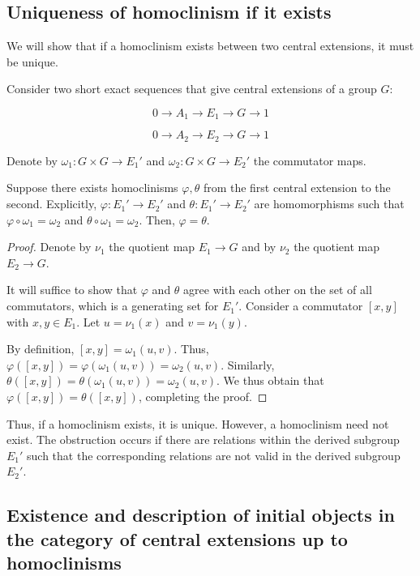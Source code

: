\subsection{Uniqueness of homoclinism if it exists}

We will show that if a homoclinism exists between two central
extensions, it must be unique.

\begin{lemma}\label{lemma:uniqueness-of-homoclinism}
  Consider two short exact sequences that give central extensions of a group $G$:

  $$0 \to A_1 \to E_1 \to G \to 1$$

  $$0 \to A_2 \to E_2 \to G \to 1$$

  Denote by $\omega_1:G \times G \to E_1'$ and $\omega_2:G \times G
  \to E_2'$ the commutator maps.

  Suppose there exists homoclinisms $\varphi,\theta$ from the first
  central extension to the second. Explicitly, $\varphi:E_1' \to E_2'$
  and $\theta:E_1' \to E_2'$ are homomorphisms such that $\varphi
  \circ \omega_1 = \omega_2$ and $\theta \circ \omega_1 =
  \omega_2$. Then, $\varphi = \theta$.
\end{lemma}

\begin{proof}
  Denote by $\nu_1$ the quotient map $E_1 \to G$ and by $\nu_2$ the
  quotient map $E_2 \to G$.

  It will suffice to show that $\varphi$ and $\theta$ agree with each
  other on the set of all commutators, which is a generating set for
  $E_1'$. Consider a commutator $[x,y]$ with $x,y \in E_1$. Let $u =
  \nu_1(x)$ and $v = \nu_1(y)$. 

  By definition, $[x,y] = \omega_1(u,v)$. Thus, $\varphi([x,y]) =
  \varphi(\omega_1(u,v)) = \omega_2(u,v)$. Similarly, $\theta([x,y]) =
  \theta(\omega_1(u,v)) = \omega_2(u,v)$. We thus obtain that
  $\varphi([x,y]) = \theta([x,y])$, completing the proof.
\end{proof}

Thus, if a homoclinism exists, it is unique. However, a homoclinism
need not exist. The obstruction occurs if there are relations within
the derived subgroup $E_1'$ such that the corresponding relations are
not valid in the derived subgroup $E_2'$.

\subsection{Existence and description of initial objects in the category of central extensions up to homoclinisms}

